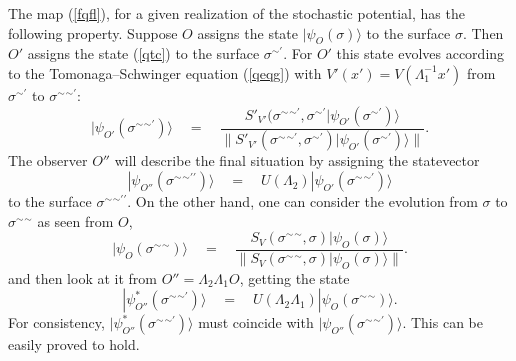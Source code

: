 \documentclass[12pt]{article}
\begin{document}
The map (\ref{fqfl}), for a given realization of the stochastic
potential, has the following property. Suppose $O$ assigns the
state $|\psi_{O}(\sigma)\rangle$ to the surface $\sigma$. Then
$O'$ assigns the state (\ref{qtc}) to the surface
$\sigma{}^{\sim\prime}$. For $O'$ this state evolves according to
the Tomonaga--Schwinger equation (\ref{qeqg}) with $V'(x') =
V(\Lambda_{1}^{-1}x')$ from $\sigma{}^{\sim\prime}$ to
$\sigma{}^{\sim}{}^{\sim\prime}$:
\begin{equation}
|\psi_{O'}(\sigma{}^{\sim}{}^{\sim\prime})\rangle \quad = \quad
\frac{ {S'}_{V'}(\sigma{}^{\sim}{}^{\sim\prime},
\sigma{}^{\sim\prime} |\psi_{O'}(\sigma{}^{\sim\prime})\rangle}{\|
{S'}_{V'}(\sigma{}^{\sim}{}^{\sim\prime}, \sigma{}^{\sim\prime})
|\psi_{O'}(\sigma{}^{\sim\prime})\rangle\|}.
\end{equation}
The observer $O''$ will describe the final situation by assigning
the statevector
\begin{equation}
|\psi_{O''}(\sigma{}^{\sim}{}^{\sim\prime\prime})\rangle \quad =
\quad U(\Lambda_{2})
|\psi_{O'}(\sigma{}^{\sim}{}^{\sim\prime})\rangle
\end{equation}
to the surface $\sigma{}^{\sim}{}^{\sim\prime\prime}$. On the
other hand, one can consider the evolution from $\sigma$ to
$\sigma{}^{\sim}{}^{\sim}$ as seen from $O$,
\begin{equation}
|\psi_{O}(\sigma{}^{\sim}{}^{\sim})\rangle \quad = \quad \frac{
S_{V}(\sigma{}^{\sim}{}^{\sim}, \sigma)
|\psi_{O}(\sigma)\rangle}{\| S_{V}(\sigma{}^{\sim}{}^{\sim},
\sigma) |\psi_{O}(\sigma)\rangle\|}.
\end{equation}
and then look at it from $O'' = \Lambda_{2}\Lambda_{1} O$, getting
the state
\begin{equation}
|\psi^{*}_{O''}(\sigma{}^{\sim}{}^{\sim\prime})\rangle \quad =
\quad U(\Lambda_{2}\Lambda_{1})
|\psi_{O}(\sigma{}^{\sim}{}^{\sim})\rangle.
\end{equation}
For consistency,
$|\psi^{*}_{O''}(\sigma{}^{\sim}{}^{\sim\prime})\rangle$ must
coincide with
$|\psi_{O''}(\sigma{}^{\sim}{}^{\sim\prime})\rangle$. This can be
easily proved to hold.
\end{document}
